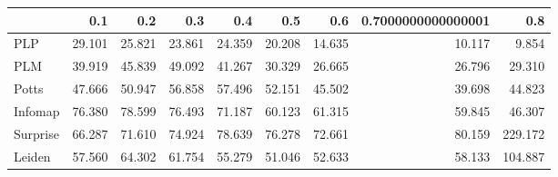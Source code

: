 \begin{tabular}{lrrrrrrrr}
\toprule
{} &    0.1 &    0.2 &    0.3 &    0.4 &    0.5 &    0.6 & 0.7000000000000001 &     0.8 \\
\midrule
PLP      & 29.101 & 25.821 & 23.861 & 24.359 & 20.208 & 14.635 &             10.117 &   9.854 \\
PLM      & 39.919 & 45.839 & 49.092 & 41.267 & 30.329 & 26.665 &             26.796 &  29.310 \\
Potts    & 47.666 & 50.947 & 56.858 & 57.496 & 52.151 & 45.502 &             39.698 &  44.823 \\
Infomap  & 76.380 & 78.599 & 76.493 & 71.187 & 60.123 & 61.315 &             59.845 &  46.307 \\
Surprise & 66.287 & 71.610 & 74.924 & 78.639 & 76.278 & 72.661 &             80.159 & 229.172 \\
Leiden   & 57.560 & 64.302 & 61.754 & 55.279 & 51.046 & 52.633 &             58.133 & 104.887 \\
\bottomrule
\end{tabular}
